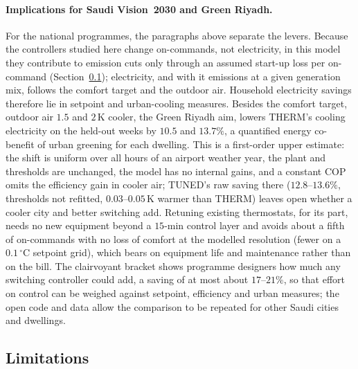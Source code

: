 \documentclass[3p,twocolumn,number]{elsarticle}
\begin{document}
\paragraph{Implications for Saudi Vision~2030 and Green Riyadh.}
For the national programmes, the paragraphs above separate the levers. Because the controllers studied here change on-commands, not electricity, in this model they contribute to emission cuts only through an assumed start-up loss per on-command (Section~\ref{subsec:limits}); electricity, and with it emissions at a given generation mix, follows the comfort target and the outdoor air. Household electricity savings therefore lie in setpoint and urban-cooling measures. Besides the comfort target, outdoor air $1.5$ and $2\,$K cooler, the Green Riyadh aim, lowers THERM's cooling electricity on the held-out weeks by $10.5$ and $13.7\%$, a quantified energy co-benefit of urban greening for each dwelling. This is a first-order upper estimate: the shift is uniform over all hours of an airport weather year, the plant and thresholds are unchanged, the model has no internal gains, and a constant COP omits the efficiency gain in cooler air; TUNED's raw saving there ($12.8$--$13.6\%$, thresholds not refitted, $0.03$--$0.05\,$K warmer than THERM) leaves open whether a cooler city and better switching add. Retuning existing thermostats, for its part, needs no new equipment beyond a $15$-min control layer and avoids about a fifth of on-commands with no loss of comfort at the modelled resolution (fewer on a $0.1\,^\circ$C setpoint grid), which bears on equipment life and maintenance rather than on the bill. The clairvoyant bracket shows programme designers how much any switching controller could add, a saving of at most about $17$--$21\%$, so that effort on control can be weighed against setpoint, efficiency and urban measures; the open code and data allow the comparison to be repeated for other Saudi cities and dwellings.

\subsection{Limitations}
\label{subsec:limits}
\label{subsec:disc_limits}
\end{document}
